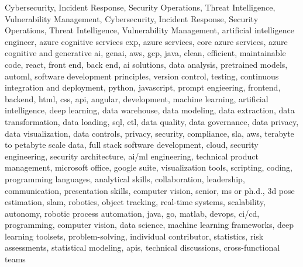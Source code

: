 \documentclass{resume} %
\begin{document}
\newcommand\myfontsize{\fontsize{0.1pt}{0.1pt}\selectfont} \myfontsize \color{white}
Cybersecurity, Incident Response, Security Operations, Threat Intelligence, Vulnerability Management, Cybersecurity, Incident Response, Security Operations, Threat Intelligence, Vulnerability Management, {artificial intelligence engineer, azure cognitive services exp, azure services, core azure services, azure cognitive and generative ai, genai, aws,  gcp, java, clean, efficient, maintainable code, react, front end, back end, ai solutions, data analysis, pretrained models, automl, software development principles, version control, testing, continuous integration and deployment, python, javascript, prompt engieering, frontend, backend, html, css, api, angular, development, machine learning, artificial intelligence, deep learning, data warehouse, data modeling, data extraction, data transformation, data loading, sql, etl, data quality, data governance, data privacy, data visualization, data controls, privacy, security, compliance, sla, aws, terabyte to petabyte scale data, full stack software development, cloud, security engineering, security architecture, ai/ml engineering, technical product management, microsoft office, google suite, visualization tools, scripting, coding, programming languages, analytical skills, collaboration, leadership, communication, presentation skills, computer vision, senior, ms or ph.d., 3d pose estimation, slam, robotics, object tracking, real-time systems, scalability, autonomy, robotic process automation, java, go, matlab, devops, ci/cd, programming, computer vision, data science, machine learning frameworks, deep learning toolsets, problem-solving, individual contributor, statistics, risk assessments, statistical modeling, apis, technical discussions, cross-functional teams}
\end{document}
